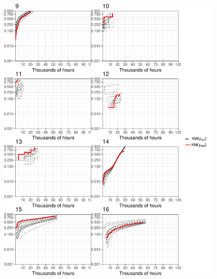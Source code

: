 \documentclass[12pt]{article}
\begin{document}
\begin{figure}[H]
\includegraphics[width=\textwidth]{ppcheck-2}
\end{figure}
\end{document}
